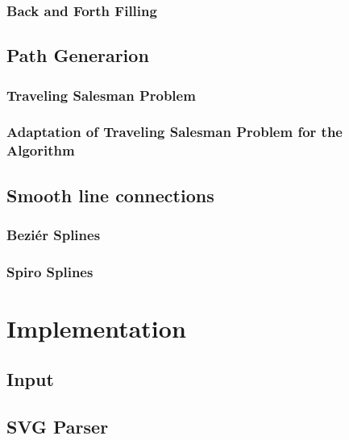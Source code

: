 \documentclass[10pt,twoside,a4paper]{report}
\begin{document}
\subsubsection{Back and Forth Filling}

\subsection{Path Generarion}
\subsubsection{Traveling Salesman Problem}
\subsubsection{Adaptation of Traveling Salesman Problem for the Algorithm}

\subsection{Smooth line connections}
\subsubsection{Beziér Splines}
\subsubsection{Spiro Splines}

\section{Implementation}
\subsection{Input}	%
\subsection{SVG Parser}
\end{document}
